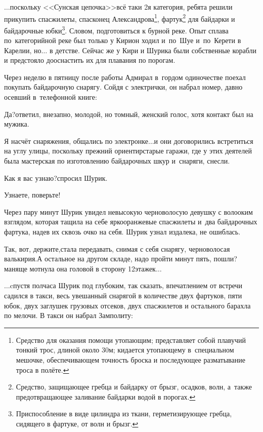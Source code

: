 \newpage
\renewcommand*{\thefootnote}{\arabic{footnote}}
$\ldots$поскольку <<Сунская цепочка>>\mdash всё таки 2\sdash я категория, ребята решили прикупить спасжилеты, спасконец Александрова\footnote[1]{Средство для оказания помощи утопающим; представляет собой плавучий тонкий трос, длиной около 30\thinspace м; кидается утопающему в~специальном мешочке, обеспечивающем точность броска и последующее разматывание троса в полёте.}, фартук\footnote[2]{Средство, защищающее гребца и байдарку от брызг, осадков, волн, а~также предотвращающее заливание байдарки водой в порогах.} для байдарки и байдарочные юбки\footnote[3]{Приспособление в виде цилиндра из ткани, герметизирующее гребца, сидящего в фартуке, от волн и брызг.}. Словом, подготовиться к бурной реке. Опыт сплава по~категорийной реке был только у Кири\mdash он ходил и~по~Шуе и~по~Керети в Карелии, но$\ldots$ в детстве. Сейчас же у Кири и Шурика были собственные корабли и предстояло дооснастить их для плавания по порогам. 

Через неделю в пятницу после работы Адмирал в~гордом одиночестве поехал покупать байдарочную снарягу. Сойдя с электрички, он набрал номер, давно осевший в~телефонной книге:

\diagdash Да?\mdash ответил, внезапно, молодой, но томный, женский голос, хотя контакт был на мужика.

\diagdash Я насчёт снаряжения, общались по электронке$\ldots$\mdash и они договорились встретиться на углу улицы, поскольку прежний ориентир\mdash старые гаражи, где у этих деятелей была мастерская по изготовлению байдарочных шкур и~снаряги, снесли.

\diagdash Как я вас узнаю?\mdash спросил Шурик.

\diagdash Узнаете, поверьте!

Через пару минут Шурик увидел невысокую черноволосую девушку с волооким взглядом, которая тащила на себе ярко\sdash оранжевые спасжилеты и~два байдарочных фартука, надев их сквозь очко на себя. Шурик узнал издалека, не ошиблась.

\diagdash Так, вот, держите,\mdash стала передавать, снимая с себя снарягу, черноволосая валькирия.\mdash А остальное на другом складе, надо пройти минут пять, пошли?\mdash маняще мотнула она головой в сторону 12\sdash этажек$\ldots$

$\ldots$cпустя полчаса Шурик под глубоким, так сказать, впечатлением от встречи садился в такси, весь увешанный снарягой в количестве двух фартуков, пяти юбок, двух заглушек грузовых отсеков, двух спасжилетов и остального барахла по мелочи. В такси он набрал Замполиту:

